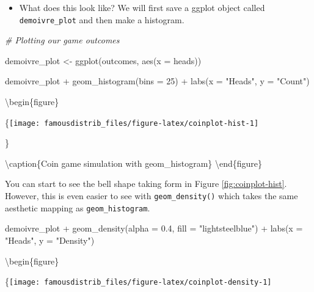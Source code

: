 \documentclass[
]{article}
\newenvironment{Shaded}{\begin{snugshade}}{\end{snugshade}}
\newcommand{\AttributeTok}[1]{\textcolor[rgb]{0.77,0.63,0.00}{#1}}
\newcommand{\CommentTok}[1]{\textcolor[rgb]{0.56,0.35,0.01}{\textit{#1}}}
\newcommand{\DecValTok}[1]{\textcolor[rgb]{0.00,0.00,0.81}{#1}}
\newcommand{\FloatTok}[1]{\textcolor[rgb]{0.00,0.00,0.81}{#1}}
\newcommand{\FunctionTok}[1]{\textcolor[rgb]{0.00,0.00,0.00}{#1}}
\newcommand{\NormalTok}[1]{#1}
\newcommand{\OtherTok}[1]{\textcolor[rgb]{0.56,0.35,0.01}{#1}}
\newcommand{\SpecialCharTok}[1]{\textcolor[rgb]{0.00,0.00,0.00}{#1}}
\newcommand{\StringTok}[1]{\textcolor[rgb]{0.31,0.60,0.02}{#1}}
\providecommand{\tightlist}{%
  \setlength{\itemsep}{0pt}\setlength{\parskip}{0pt}}
\begin{document}
\begin{itemize}
\tightlist
\item
  What does this look like? We will first save a ggplot object called \texttt{demoivre\_plot} and then make a histogram.
\end{itemize}

\begin{Shaded}
\begin{Highlighting}[]
\CommentTok{\# Plotting our game outcomes}

\NormalTok{demoivre\_plot }\OtherTok{\textless{}{-}} \FunctionTok{ggplot}\NormalTok{(outcomes, }\FunctionTok{aes}\NormalTok{(}\AttributeTok{x =}\NormalTok{ heads))}
  
\NormalTok{demoivre\_plot }\SpecialCharTok{+}
  \FunctionTok{geom\_histogram}\NormalTok{(}\AttributeTok{bins =} \DecValTok{25}\NormalTok{) }\SpecialCharTok{+}
  \FunctionTok{labs}\NormalTok{(}\AttributeTok{x =} \StringTok{"Heads"}\NormalTok{, }\AttributeTok{y =} \StringTok{"Count"}\NormalTok{)}
\end{Highlighting}
\end{Shaded}

\textbackslash begin\{figure\}

\{\centering \texttt{[image: famousdistrib\_files/figure-latex/coinplot-hist-1]}

\}

\textbackslash caption\{Coin game simulation with geom\_histogram\}\label{fig:coinplot-hist}
\textbackslash end\{figure\}

You can start to see the bell shape taking form in Figure \ref{fig:coinplot-hist}. However, this is even easier to see with \texttt{geom\_density()} which takes the same aesthetic mapping as \texttt{geom\_histogram}.

\begin{Shaded}
\begin{Highlighting}[]
\NormalTok{demoivre\_plot }\SpecialCharTok{+}
  \FunctionTok{geom\_density}\NormalTok{(}\AttributeTok{alpha =} \FloatTok{0.4}\NormalTok{, }\AttributeTok{fill =} \StringTok{"lightsteelblue"}\NormalTok{) }\SpecialCharTok{+}
  \FunctionTok{labs}\NormalTok{(}\AttributeTok{x =} \StringTok{"Heads"}\NormalTok{, }\AttributeTok{y =} \StringTok{"Density"}\NormalTok{)}
\end{Highlighting}
\end{Shaded}

\textbackslash begin\{figure\}

\{\centering \texttt{[image: famousdistrib\_files/figure-latex/coinplot-density-1]}
\end{document}
